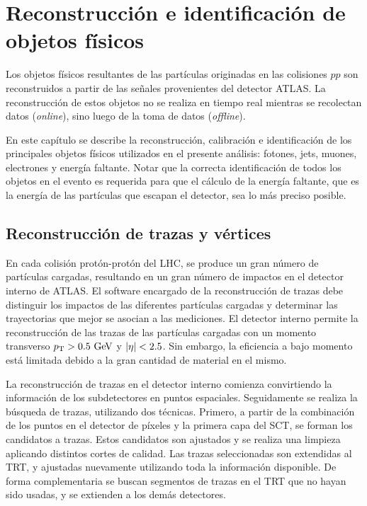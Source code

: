 \chapter{Reconstrucción e identificación de objetos físicos}
\label{cap:objetos}

Los objetos físicos resultantes de las partículas originadas en las colisiones
$pp$ son reconstruidos a partir de las señales provenientes del detector ATLAS.
La reconstrucción de estos objetos no se realiza en tiempo real mientras se
recolectan datos (\emph{online}), sino luego de la toma de datos (\emph{offline}).

En este capítulo se describe la reconstrucción, calibración e identificación de
los principales objetos físicos utilizados en el presente análisis: fotones,
jets, muones, electrones y energía faltante. Notar que la correcta
identificación de todos los objetos en el evento es requerida para que el
cálculo de la energía faltante, que es la energía de las partículas que escapan
el detector, sea lo más preciso posible.


\section{Reconstrucción de trazas y vértices}
\label{sec:obj_vertex}

En cada colisión protón-protón del LHC, se produce un gran número de partículas
cargadas, resultando en un gran número de impactos en el detector interno de
ATLAS. El software encargado de la reconstrucción de trazas debe distinguir los
impactos de las diferentes partículas cargadas y determinar las trayectorias que
mejor se asocian a las mediciones. El detector interno permite la reconstrucción
de las trazas de las partículas cargadas con un momento transverso $\pt>0.5 \gev$
y $\abseta < 2.5$. Sin embargo, la eficiencia a bajo momento está
limitada debido a la gran cantidad de material en el mismo.

La reconstrucción de trazas en el detector interno comienza convirtiendo la
información de los subdetectores en puntos espaciales. Seguidamente se realiza
la búsqueda de trazas, utilizando dos técnicas. Primero, a
partir de la combinación de los puntos en el detector de píxeles y la primera
capa del SCT, se forman los candidatos a trazas. Estos candidatos son ajustados
y se realiza una limpieza aplicando distintos cortes de calidad. Las
trazas seleccionadas son extendidas al TRT, y ajustadas nuevamente utilizando
toda la información disponible. De forma complementaria se buscan segmentos de
trazas en el TRT que no hayan sido usadas, y se extienden a los demás
detectores.


